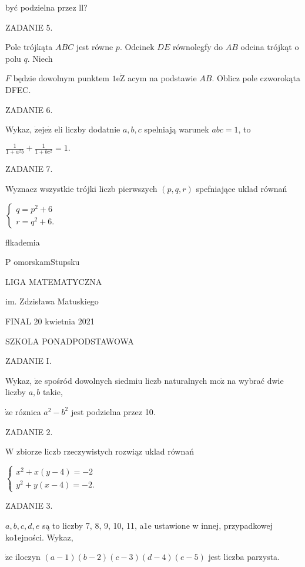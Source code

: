 \documentclass[a4paper,12pt]{article}
\begin{document}
być podzielna przez ll?

ZADANIE 5.

Pole trójkąta $ABC$ jest równe $p$. Odcinek $DE$ równolegfy do $AB$ odcina trójkąt o polu $q$. Niech

$F$ będzie dowolnym punktem $1\mathrm{e}\dot{\mathrm{Z}}$ acym na podstawie $AB$. Oblicz pole czworokąta DFEC.

ZADANIE 6.

Wykaz, $\dot{\mathrm{z}}\mathrm{e}\mathrm{j}\mathrm{e}\dot{\mathrm{z}}$ eli liczby dodatnie $a, b, c$ spelniają warunek $abc=1$, to

$\displaystyle \frac{1}{1+a^{2}b}+\frac{1}{1+bc^{2}}=1.$

ZADANIE 7.

Wyznacz wszystkie trójki liczb pierwszych $(p,q,r)$ spefniające uklad równań

$\left\{\begin{array}{l}
q=p^{2}+6\\
r=q^{2}+6.
\end{array}\right.$






flkademia

P omorskamStupsku

LIGA MATEMATYCZNA

im. Zdzisława Matuskiego

FINAL 20 kwietnia 2021

SZKOLA PONADPODSTAWOWA

ZADANIE I.

Wykaz, $\dot{\mathrm{z}}\mathrm{e}$ spośród dowolnych siedmiu liczb naturalnych $\mathrm{m}\mathrm{o}\dot{\mathrm{z}}$ na wybrać dwie liczby $a, b$ takie,

$\dot{\mathrm{z}}\mathrm{e}$ róznica $a^{2}-b^{2}$ jest podzielna przez 10.

ZADANIE 2.

$\mathrm{W}$ zbiorze liczb rzeczywistych rozwiąz uklad równań

$\left\{\begin{array}{l}
x^{2}+x(y-4)=-2\\
y^{2}+y(x-4)=-2.
\end{array}\right.$

ZADANIE 3.

$a, b, c, d, e$ są to liczby 7, 8, 9, 10, 11, a1e ustawione w innej, przypadkowej ko1ejności. Wykaz,

$\dot{\mathrm{z}}\mathrm{e}$ iloczyn $(a-1)(b-2)(c-3)(d-4)(e-5)$ jest liczba parzysta.
\end{document}
